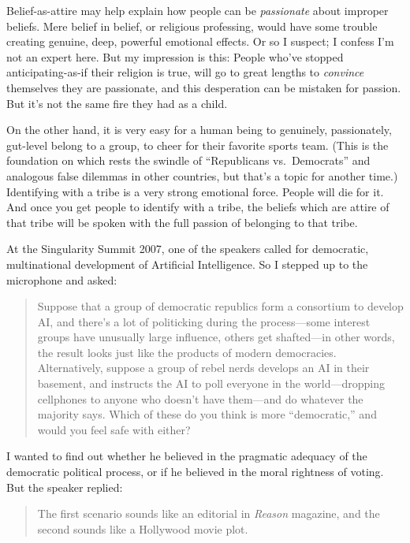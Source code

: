 {
 Belief-as-attire may help explain how people can be
\textit{passionate} about improper beliefs. Mere belief in belief, or
religious professing, would have some trouble creating genuine, deep,
powerful emotional effects. Or so I suspect; I confess
I'm not an expert here. But my impression is this:
People who've stopped anticipating-as-if their religion
is true, will go to great lengths to \textit{convince} themselves they
are passionate, and this desperation can be mistaken for passion. But
it's not the same fire they had as a child.}

{
 On the other hand, it is very easy for a human being to genuinely,
passionately, gut-level belong to a group, to cheer for their favorite
sports team. (This is the foundation on which rests the swindle of
``Republicans vs.\ Democrats'' and
analogous false dilemmas in other countries, but that's
a topic for another time.) Identifying with a tribe is a very strong
emotional force. People will die for it. And once you get people to
identify with a tribe, the beliefs which are attire of that tribe will
be spoken with the full passion of belonging to that tribe.}

\myendsectiontext


{
 At the Singularity Summit 2007, one of the speakers called for
democratic, multinational development of Artificial Intelligence. So I
stepped up to the microphone and asked:}

\begin{quote}
{
 Suppose that a group of democratic republics form a consortium to
develop AI, and there's a lot of politicking during the
process---some interest groups have unusually large influence, others
get shafted---in other words, the result looks just like the products
of modern democracies. Alternatively, suppose a group of rebel nerds
develops an AI in their basement, and instructs the AI to poll everyone
in the world---dropping cellphones to anyone who
doesn't have them---and do whatever the majority says.
Which of these do you think is more
``democratic,'' and would you feel
safe with either?}
\end{quote}

{
 I wanted to find out whether he believed in the pragmatic adequacy
of the democratic political process, or if he believed in the moral
rightness of voting. But the speaker replied:}

\begin{quote}
{
 The first scenario sounds like an editorial in \textit{Reason}
 magazine, and the second sounds like a Hollywood movie plot.}
\end{quote}

